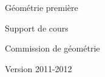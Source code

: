 \documentclass[twoside]{report}
\begin{document}
	\begin{titlepage}
		\vspace{5cm}
		\centerline{\Huge{Géométrie première}}
		\vspace{.3cm}
		\centerline{\LARGE Support de cours}
		\vspace{7cm}
		\centerline{Commission de géométrie}
		\centerline{Version 2011-2012}
		\centerline{
			\ccLogo \ccAttribution \ccNonCommercialEU \ccShareAlike
		}
	\end{titlepage}
\end{document}
